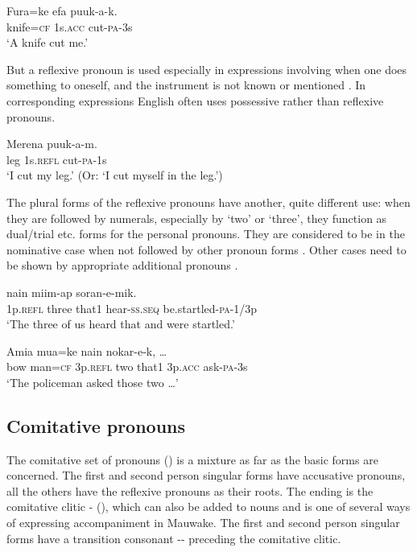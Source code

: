 \ea%
\label{ex:3:x617}
\gll Fura=ke efa puuk-a-k. \\
knife=\textsc{cf} 1s.\textsc{acc} cut-\textsc{pa}-3s\\
\glt`A knife cut me.'
\z

But a reflexive pronoun is used especially in expressions involving  when one does something to oneself, and the instrument is not known or mentioned . In corresponding expressions English often uses possessive rather than reflexive pronouns.

\ea%
\label{ex:3:x618}
\gll Merena  puuk-a-m. \\
leg 1s.\textsc{refl} cut-\textsc{pa}-1s\\
\glt`I cut my leg.' (Or: `I cut myself in the leg.')
\z

The plural forms of the reflexive pronouns have another, quite different use: when they are followed by numerals, especially by `two' or `three', they function as dual/trial etc. forms for the personal pronouns. They are considered to be in the nominative case when not followed by other pronoun forms . Other cases need to be shown by appropriate additional pronouns .

\ea%
\label{ex:3:x615}
\gll {}  nain miim-ap soran-e-mik. \\
1p.\textsc{refl} three that1 hear-\textsc{ss}.\textsc{seq} be.startled-\textsc{pa}-1/3p\\
\glt`The three of us heard that and were startled.'
\z

\ea%
\label{ex:3:x616}
\gll Amia mua=ke   nain  nokar-e-k, {\dots} \\
bow man=\textsc{cf} 3p.\textsc{refl} two that1 3p.\textsc{acc} ask-\textsc{pa}-3s\\
\glt`The policeman asked those two {\dots}'
\z

\subsection{Comitative pronouns}\label{sec:3.5.9}
{}
The comitative set of pronouns () is a mixture as far as the basic forms are concerned. The first and second person singular forms have accusative pronouns, all the others have the reflexive pronouns as their roots. The ending is the comitative clitic - (), which can also be added to nouns and is one of several ways of expressing accompaniment in Mauwake. The first and second person singular forms have a transition consonant -- preceding the comitative clitic.

